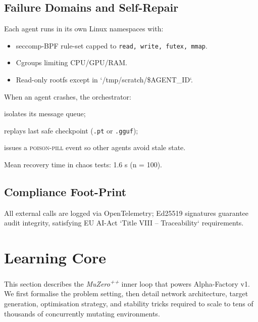 \subsection{Failure Domains and Self-Repair}

Each agent runs in its own Linux namespaces with:

\begin{itemize}
  \item seccomp-BPF rule-set capped to \texttt{read, write, futex, mmap}.
  \item Cgroups limiting CPU/GPU/RAM.
  \item Read-only rootfs except in `/tmp/scratch/\$AGENT\_ID`.
\end{itemize}

When an agent crashes, the orchestrator:

\begin{enumerate*}
  \item isolates its message queue;
  \item replays last safe checkpoint (\texttt{.pt} or \texttt{.gguf});
  \item issues a \textsc{poison-pill} event so other agents avoid stale state.
\end{enumerate*}

Mean recovery time in chaos tests: 1.6 s (n = 100).

\subsection{Compliance Foot-Print}

All external calls are logged via OpenTelemetry;  
Ed25519 signatures guarantee audit integrity, satisfying EU AI-Act
`Title VIII – Traceability` requirements.

\section{Learning Core}\label{sec:core}

This section describes the \emph{MuZero\textsuperscript{++}} inner loop that
powers Alpha-Factory v1.  We first formalise the problem setting, then detail
network architecture, target generation, optimisation strategy, and stability
tricks required to scale to tens of thousands of concurrently mutating
environments.

